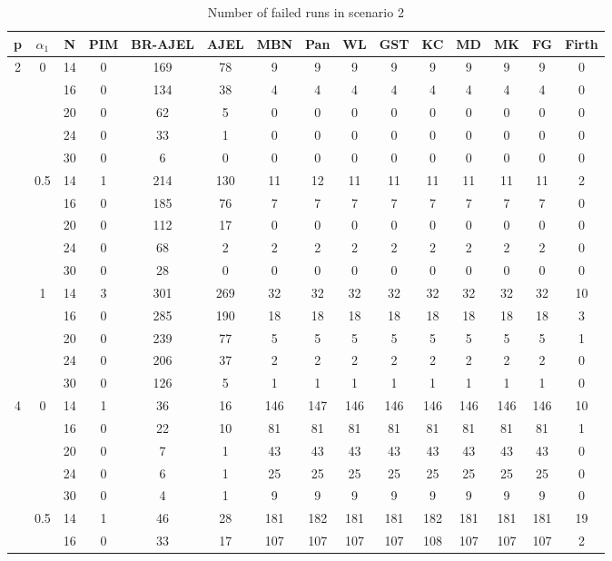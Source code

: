 \documentclass[num-refs]{wiley-article}
\begin{document}
\begin{table}[htbp!]
\scriptsize
\caption{Number of failed runs in scenario 2}
\centering
\begin{tabular}[t]{ccccccccccccccc}
\hline
p & $\alpha_1$ & N & PIM & BR-AJEL & AJEL & MBN & Pan & WL & GST & KC & MD & MK & FG & Firth\\
\hline
2 & 0 & 14 & 0 & 169 & 78 & 9 & 9 & 9 & 9 & 9 & 9 & 9 & 9 & 0\\
& & 16 & 0 & 134 & 38 & 4 & 4 & 4 & 4 & 4 & 4 & 4 & 4 & 0\\
&& 20 & 0 & 62 & 5 & 0 & 0 & 0 & 0 & 0 & 0 & 0 & 0 & 0\\
& & 24 & 0 & 33 & 1 & 0 & 0 & 0 & 0 & 0 & 0 & 0 & 0 & 0\\
& & 30 & 0 & 6 & 0 & 0 & 0 & 0 & 0 & 0 & 0 & 0 & 0 & 0\\
\hline
 & 0.5 & 14 & 1 & 214 & 130 & 11 & 12 & 11 & 11 & 11 & 11 & 11 & 11 & 2\\
&& 16 & 0 & 185 & 76 & 7 & 7 & 7 & 7 & 7 & 7 & 7 & 7 & 0\\
&& 20 & 0 & 112 & 17 & 0 & 0 & 0 & 0 & 0 & 0 & 0 & 0 & 0\\
& & 24 & 0 & 68 & 2 & 2 & 2 & 2 & 2 & 2 & 2 & 2 & 2 & 0\\
& & 30 & 0 & 28 & 0 & 0 & 0 & 0 & 0 & 0 & 0 & 0 & 0 & 0\\
\hline
 & 1 & 14 & 3 & 301 & 269 & 32 & 32 & 32 & 32 & 32 & 32 & 32 & 32 & 10\\
& & 16 & 0 & 285 & 190 & 18 & 18 & 18 & 18 & 18 & 18 & 18 & 18 & 3\\
& & 20 & 0 & 239 & 77 & 5 & 5 & 5 & 5 & 5 & 5 & 5 & 5 & 1\\
& & 24 & 0 & 206 & 37 & 2 & 2 & 2 & 2 & 2 & 2 & 2 & 2 & 0\\
& & 30 & 0 & 126 & 5 & 1 & 1 & 1 & 1 & 1 & 1 & 1 & 1 & 0\\
\hline
4 & 0 & 14 & 1 & 36 & 16 & 146 & 147 & 146 & 146 & 146 & 146 & 146 & 146 & 10\\
&& 16 & 0 & 22 & 10 & 81 & 81 & 81 & 81 & 81 & 81 & 81 & 81 & 1\\
&& 20 & 0 & 7 & 1 & 43 & 43 & 43 & 43 & 43 & 43 & 43 & 43 & 0\\
&& 24 & 0 & 6 & 1 & 25 & 25 & 25 & 25 & 25 & 25 & 25 & 25 & 0\\
&& 30 & 0 & 4 & 1 & 9 & 9 & 9 & 9 & 9 & 9 & 9 & 9 & 0\\
\hline
 & 0.5 & 14 & 1 & 46 & 28 & 181 & 182 & 181 & 181 & 182 & 181 & 181 & 181 & 19\\
& & 16 & 0 & 33 & 17 & 107 & 107 & 107 & 107 & 108 & 107 & 107 & 107 & 2\\

\end{tabular}
\end{table}
\end{document}

